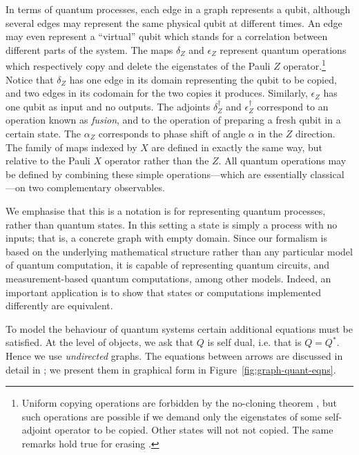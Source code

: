 \documentclass[runningheads]{llncs}
\begin{document}
In terms of quantum processes, each edge in a graph represents a
qubit, although several edges may represent the same physical qubit at
different times.  An edge may even represent a ``virtual'' qubit which
stands for a correlation between different parts of the system.  The
maps $\delta_Z$ and $\epsilon_Z$ represent quantum operations which
respectively copy and delete the eigenstates of the Pauli $Z$
operator.\footnote{Uniform copying operations are forbidden by the
  no-cloning theorem \cite{Wootters1982A-single-quantu}, but such operations are
  possible if we demand only the eigenstates of some self-adjoint
  operator to be copied.  Other states will not not copied.  The same
  remarks hold true for erasing \cite{Pati2000Impossibility-o}.}  Notice that $\delta_Z$ has one edge
in its domain representing the qubit to be copied, and two edges in
its codomain for the two copies it produces.  Similarly, $\epsilon_Z$
has one qubit as input and no outputs.  The adjoints $\delta^\dag_Z$
and $\epsilon^\dag_Z$ correspond to an operation known as
\emph{fusion}, and to the operation of preparing a fresh qubit in a
certain state.  The $\alpha_Z$ corresponds to phase shift of angle
$\alpha$ in the $Z$ direction.  The family of maps indexed by $X$ are
defined in exactly the same way, but relative to the Pauli $X$
operator rather than the $Z$.  All quantum operations may be defined
by combining these simple operations---which are essentially
classical---on two complementary observables.

We emphasise that this is a notation is for representing quantum
processes, rather than quantum states.  In this setting a state is
simply a process with no inputs; that is, a concrete graph with
empty domain.
  Since our formalism is based on the
underlying mathematical structure rather than any particular model of
quantum computation, it is capable of representing  quantum circuits,
and measurement-based quantum computations, among other models.
Indeed, an important application is to show that states or 
computations implemented differently are equivalent.

To model the behaviour of quantum systems certain additional equations
must be satisfied.  At the  level of objects, we ask that  $Q$ is
self dual, i.e. that is $Q = Q^*$.  Hence we use \emph{undirected}
graphs.  The equations between arrows are discussed in detail in
\cite{Coecke:2008jo};  we present them in graphical form in
Figure~\ref{fig:graph-quant-eqns}.
\end{document}
